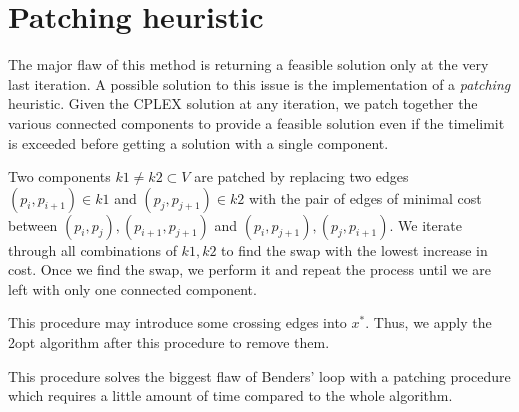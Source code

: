 \section{Patching heuristic}
The major flaw of this method is returning a feasible solution only at the very last iteration. A possible solution to this issue is the implementation of a \textit{patching} heuristic. Given the CPLEX solution at any iteration, we patch together the various connected components to provide a feasible solution even if the timelimit is exceeded before getting a solution with a single component.

Two components $k1\neq k2\subset V$ are patched by replacing two edges $(p_i, p_{i+1})\in k1$ and $(p_j, p_{j+1})\in k2$ with the pair of edges of minimal cost between $(p_i,p_j), (p_{i+1},p_{j+1})$ and $(p_i,p_{j+1}),(p_j, p_{i+1})$. We iterate through all combinations of $k1,k2$ to find the swap with the lowest increase in cost. Once we find the swap, we perform it and repeat the process until we are left with only one connected component.

This procedure may introduce some crossing edges into $x^*$. Thus, we apply the 2opt algorithm after this procedure to remove them.

This procedure solves the biggest flaw of Benders' loop with a patching procedure which requires a little amount of time compared to the whole algorithm.

\newpage
